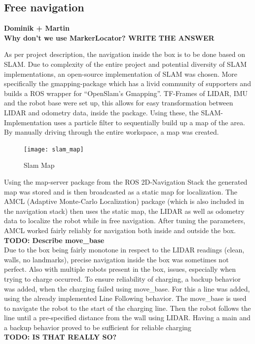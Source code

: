     \subsection{Free navigation} %
    \label{sub:mr_free_navigation}

    \textbf{Dominik + Martin}\\
    \textbf{Why don't we use MarkerLocator? WRITE THE ANSWER}
    
    As per project description, the navigation inside the box is to be done based on SLAM. 
    Due to complexity of the entire project and potential diversity of SLAM implementations, an open-source implementation of SLAM was chosen. 
    More specifically the gmapping-package \cite{gmapping} which has a livid community of supporters and builds a ROS wrapper for “OpenSlam's Gmapping”\cite{openslam}. 
    TF-Frames of LIDAR, IMU and the robot base were set up, this allows for easy transformation between LIDAR and odometry data, inside the package. 
    Using these, the SLAM-Implementation uses a particle filter to sequentially build up a map of the area. 
    By manually driving through the entire workspace, a map was created. 
    \begin{figure}[H]
        \centering
        \texttt{[image: slam\_map]}
        \caption{Slam Map}
        \label{fig:slam_map}
    \end{figure}
    Using the map-server package from the ROS 2D-Navigation Stack \cite{navigation_stack} the generated map was stored and is then broadcasted as a static map for localization. 
    The AMCL (Adaptive Monte-Carlo Localization) package (which is also included in the navigation stack) then uses the static map, the LIDAR as well as odometry data to localize the robot while in free navigation. 
    After tuning the parameters, AMCL worked fairly reliably for navigation both inside and outside the box.\\
    \textbf{TODO: Describe move{\_}base}\\
    Due to the box being fairly monotone in respect to the LIDAR readings (clean, walls, no landmarks), precise navigation inside the box was sometimes not perfect. 
    Also with multiple robots present in the box, issues, especially when trying to charge occurred. 
    To ensure reliability of charging, a backup behavior was added, when the charging failed using move{\_}base. 
    For this a line was added, using the already implemented Line Following behavior. 
    The move{\_}base is used to navigate the robot to the start of the charging line. 
    Then the robot follows the line until a pre-specified distance from the wall using LIDAR. 
    Having a main and a backup behavior proved to be sufficient for reliable charging\\
    \textbf{TODO: IS THAT REALLY SO?}

